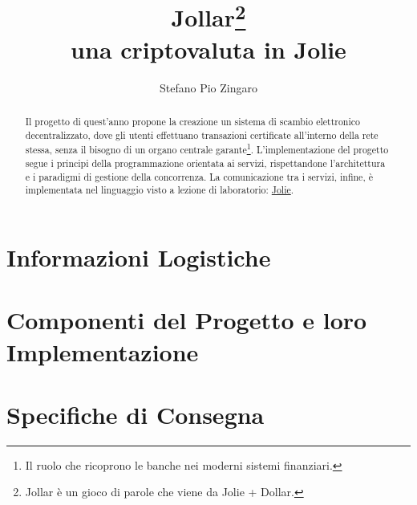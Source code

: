 \documentclass[12pt,a4paper]{article}
\title{Jollar\footnote{Jollar è un gioco di parole che viene da Jolie + Dollar.} \\ una criptovaluta in Jolie}
\author{Stefano Pio Zingaro}
\begin{document}
\maketitle

\begin{abstract}
\noindent Il progetto di quest'anno propone la creazione un sistema di scambio elettronico decentralizzato, dove gli utenti effettuano transazioni certificate all'interno della rete stessa, senza il bisogno di un organo centrale garante\footnote{Il ruolo che ricoprono le banche nei moderni sistemi finanziari.}. L'implementazione del progetto segue i principi della programmazione orientata ai servizi, rispettandone l'architettura e i paradigmi di gestione della concorrenza. La comunicazione tra i servizi, infine, è implementata nel linguaggio visto a lezione di laboratorio: \href{http://jolie-lang.org}{Jolie}.
\end{abstract}

\tableofcontents

\newpage

\section{Informazioni Logistiche}


\newpage

\section{Componenti del Progetto e loro Implementazione}


\newpage

\section{Specifiche di Consegna}

\end{document}
